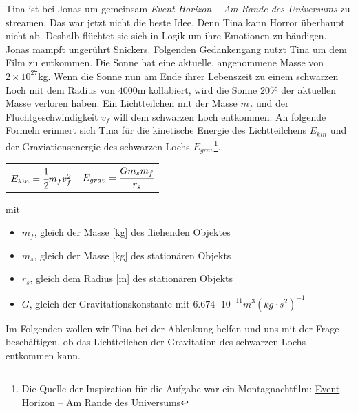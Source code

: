 \documentclass[a4paper, 9pt]{scrartcl}\usepackage[]{graphicx}\usepackage[]{xcolor}
\begin{document}
Tina ist bei Jonas um gemeinsam \textit{Event Horizon -- Am Rande des Universums} zu streamen. Das war jetzt nicht die beste Idee. Denn Tina kann Horror überhaupt nicht ab. Deshalb flüchtet sie sich in Logik um ihre Emotionen zu bändigen. Jonas mampft ungerührt Snickers. Folgenden Gedankengang nutzt Tina um dem Film zu entkommen. Die Sonne hat eine aktuelle, angenommene Masse von $\ensuremath{2\times 10^{27}}$kg. Wenn die Sonne nun am Ende ihrer Lebenszeit zu einem schwarzen Loch mit dem Radius von $4000$m kollabiert, wird die Sonne $20$\% der aktuellen Masse verloren haben. Ein Lichtteilchen mit der Masse $m_f$ und der Fluchtgeschwindigkeit $v_f$ will dem schwarzen Loch entkommen. An folgende Formeln erinnert sich Tina für die kinetische Energie des Lichtteilchens $E_{kin}$ und der Graviationsenergie des schwarzen Lochs $E_{grav}$\footnote{Die Quelle der Inspiration für die Aufgabe war ein Montagnachtfilm: \href{https://de.wikipedia.org/wiki/Event_Horizon_–_Am_Rande_des_Universums}{Event Horizon – Am Rande des Universums}}.

\begin{center}
  \begin{tabular}{cc}
    $E_{kin} = \cfrac{1}{2}m_fv_f^2$ & $E_{grav} = \cfrac{Gm_sm_f}{r_s}$\\
  \end{tabular}
\end{center}

mit

\begin{itemize}[noitemsep]
\item $m_f$, gleich der Masse [kg] des fliehenden Objektes
\item $m_s$, gleich der Masse [kg] des stationären Objekts
\item $r_s$, gleich dem Radius [m] des stationären Objekts  
\item $G$, gleich der Gravitationskonstante mit $6.674 \cdot 10^{-11} m^3(kg \cdot s^2)^{-1}$ 
\end{itemize}

Im Folgenden wollen wir Tina bei der Ablenkung helfen und uns mit der Frage beschäftigen, ob das Lichtteilchen der Gravitation des schwarzen Lochs entkommen kann.
\end{document}
